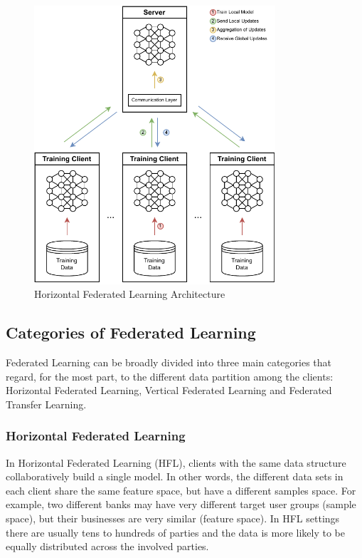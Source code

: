 \begin{figure}[!ht]
    \centering
    \includegraphics[width=0.8\textwidth]{graphics/hfl-architecture.pdf}
    \caption{Horizontal Federated Learning Architecture}
    \label{fig:hfl_arch}
\end{figure}

\subsection{Categories of Federated Learning}

Federated Learning can be broadly divided into three main categories \cite{10.1145/3298981, 10.1145/3412357} that regard, for the most part, to the different data partition among the clients: Horizontal Federated Learning, Vertical Federated Learning and Federated Transfer Learning.

\subsubsection{Horizontal Federated Learning}

In Horizontal Federated Learning (HFL), clients with the same data structure collaboratively build a single model. In other words, the different data sets in each client share the same feature space, but have a different samples space. For example, two different banks may have very different target user groups (sample space), but their businesses are very similar (feature space). In HFL settings there are usually tens to hundreds of parties and the data is more likely to be equally distributed across the involved parties.

